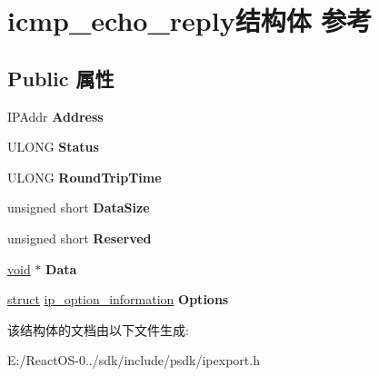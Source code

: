 \hypertarget{structicmp__echo__reply}{}\section{icmp\+\_\+echo\+\_\+reply结构体 参考}
\label{structicmp__echo__reply}
\subsection*{Public 属性}
\begin{DoxyCompactItemize}
\item 
\mbox{\label{structicmp__echo__reply_a47c34f5ba493da636a42128855bc70ae}} 
I\+P\+Addr {\bfseries Address}
\item 
\mbox{\label{structicmp__echo__reply_a453a95e032a22042b53a37c83ea14372}} 
U\+L\+O\+NG {\bfseries Status}
\item 
\mbox{\label{structicmp__echo__reply_afb6e0631bcd71b3b0709235f5f363b99}} 
U\+L\+O\+NG {\bfseries Round\+Trip\+Time}
\item 
\mbox{\label{structicmp__echo__reply_ac1f05a353a968e14ef1433a4f8ae2e1c}} 
unsigned short {\bfseries Data\+Size}
\item 
\mbox{\label{structicmp__echo__reply_a6871cd7f16353d6b8362861c311600a1}} 
unsigned short {\bfseries Reserved}
\item 
\mbox{\label{structicmp__echo__reply_a150eddf747089b742f39c3a94109a66f}} 
\hyperlink{interfacevoid}{void} $\ast$ {\bfseries Data}
\item 
\mbox{\label{structicmp__echo__reply_af4f4acef16691532f7df30c22a39f49d}} 
\hyperlink{interfacestruct}{struct} \hyperlink{structip__option__information}{ip\+\_\+option\+\_\+information} {\bfseries Options}
\end{DoxyCompactItemize}


该结构体的文档由以下文件生成\+:\begin{DoxyCompactItemize}
\item 
E\+:/\+React\+O\+S-\/0../sdk/include/psdk/ipexport.\+h\end{DoxyCompactItemize}
